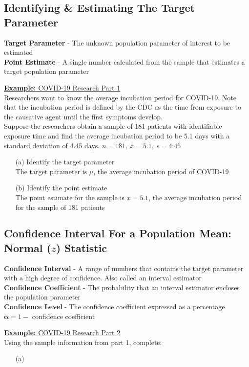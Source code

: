 \documentclass[a4paper]{article}
\let\bf\textbf
\begin{document}
\subsection{Identifying \& Estimating The Target Parameter}
\bf{Target Parameter} - The unknown population parameter of interest to be estimated
\vspace{1mm}\\
\bf{Point Estimate} - A single number calculated from the sample that estimates a target population parameter
\begin{shaded}
    \underline{\bf{Example:} COVID-19 Research Part 1}
    \vspace{1mm}\\
    Researchers want to know the average incubation period for COVID-19. Note that the incubation period is defined by the CDC as the time from exposure to the causative agent until the first symptoms develop.\vspace{1mm}\\
    Suppose the researchers obtain a sample of 181 patients with identifiable exposure time and find the average incubation period to be 5.1 days with a standard deviation of 4.45 days. $n = 181,\ \bar{x} = 5.1,\ s = 4.45$
    \begin{enumerate}
        \item[(a)] Identify the target parameter\\
        The target parameter is $\mu$, the average incubation period of COVID-19
        \item[(b)] Identify the point estimate\\
        The point estimate for the sample is $\bar{x} = 5.1$, the average incubation period for the sample of 181 patients
    \end{enumerate}
\end{shaded}
\subsection{Confidence Interval For a Population Mean: Normal ($z$) Statistic}
\bf{Confidence Interval} - A range of numbers that contains the target parameter with a high degree of confidence. Also called an interval estimator\vspace{1mm}\\
\bf{Confidence Coefficient} - The probability that an interval estimator encloses the population parameter\vspace{1mm}\\
\bf{Confidence Level} - The confidence coefficient expressed as a percentage\vspace{1mm}\\
$\boldsymbol{\alpha} = 1 -$ confidence coefficient
\begin{shaded}
    \underline{\bf{Example:} COVID-19 Research Part 2}
    \vspace{2mm}\\
    Using the sample information from part 1, complete:
    \begin{enumerate}
        \item[(a)] 
    \end{enumerate}
\end{shaded} 
\end{document}
